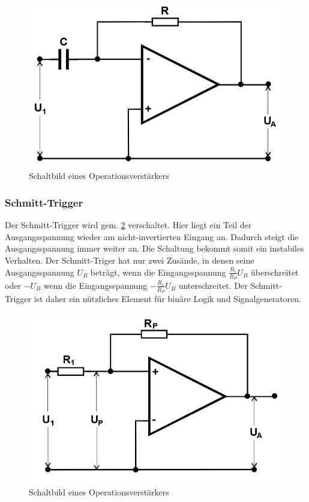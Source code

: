 \begin{figure}
 	\centering
 	\includegraphics[width=\textwidth]{img/diff.png}
 	\caption{Schaltbild eines Operationsverstärkers \cite{FP}}
 	\label{abb:diff}
\end{figure}


\subsubsection{Schmitt-Trigger}
Der Schmitt-Trigger wird gem. \ref{abb:sch} verschaltet. Hier liegt ein Teil der Ausgangsspannung wieder am  nicht-invertierten Eingang an. Dadurch steigt die Ausgangsspannung immer weiter an. Die Schaltung bekommt somit ein instabiles Verhalten. Der Schmitt-Triger hat nur zwei Zusände, in denen seine Ausgangsspannung $U_B$ beträgt, wenn die Eingangsspannung $\frac{R_1}{R_P} U_B$ überschreitet oder
$-U_B$ wenn die Eingangsspannung $-\frac{R_1}{R_P} U_B$ unterschreitet. Der Schmitt-Trigger ist daher ein nützliches Element für binäre Logik und Signalgeneratoren.

\begin{figure}
 	\centering
 	\includegraphics[width=\textwidth]{img/schmitt.png}
 	\caption{Schaltbild eines Operationsverstärkers \cite{FP}}
 	\label{abb:sch}
\end{figure}

